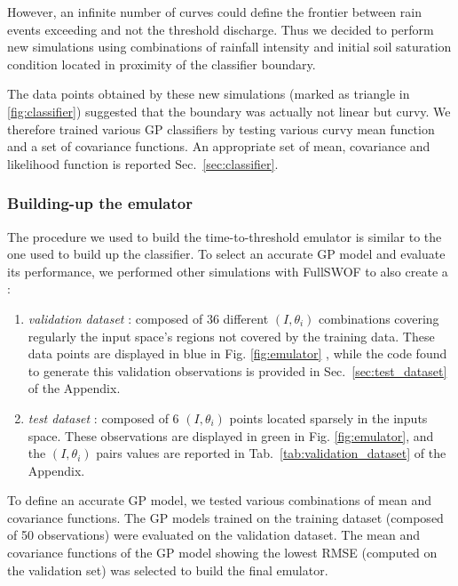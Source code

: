 However, an infinite number of curves could define the frontier between rain events exceeding and not the threshold discharge. Thus we decided to perform new simulations using combinations of rainfall intensity and initial soil saturation condition located in proximity of the classifier boundary. 

The data points obtained by these new simulations (marked as triangle in \ref{fig:classifier}) suggested that the boundary was actually not linear but curvy. 
We therefore trained various GP classifiers by testing various curvy mean function and a set of covariance functions. An appropriate set of mean, covariance and likelihood function is reported  Sec.~\ref{sec:classifier}.
 

\subsubsection{Building-up the emulator}
The procedure we used to build the time-to-threshold emulator is similar to the one used to build up the classifier.
To select an accurate GP model and evaluate its performance, we performed other simulations with FullSWOF to also create a : 

\begin{enumerate}
   \item \emph{validation dataset} : composed of \num{36} different $(I, \theta_i)$ combinations covering  regularly the input space's regions not covered by the training data. These data points are displayed in blue in Fig. \ref{fig:emulator} , while the code found to generate this validation observations is provided in Sec.~\ref{sec:test_dataset} of the Appendix.
   \item \emph{test dataset} : composed of \num{6} $(I, \theta_i)$ points located sparsely in the inputs space. These observations are displayed in green in Fig. \ref{fig:emulator}, and the $(I,    \theta_i)$ pairs values  are reported in Tab.~\ref{tab:validation_dataset} of the Appendix.
\end{enumerate}

To define an accurate GP model, we tested various combinations of mean and covariance functions. 
The GP models trained on the training dataset (composed of 50 observations) were evaluated on the validation dataset. The mean and covariance functions of the GP model showing the lowest RMSE (computed on the validation set) was selected to build the final emulator. 

